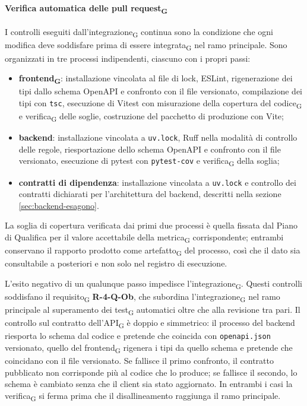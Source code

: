 \documentclass[a4paper, 10pt]{article}
\begin{document}
\paragraph{Verifica automatica delle pull request\textsubscript{G}}
I controlli eseguiti dall'integrazione\textsubscript{G} continua sono la condizione che ogni modifica deve soddisfare prima di essere integrata\textsubscript{G} nel ramo principale. Sono organizzati in tre processi indipendenti, ciascuno con i propri passi:

\begin{itemize}
    \setlength{\itemsep}{2pt}
    \item \textbf{frontend\textsubscript{G}}: installazione vincolata al file di lock, ESLint, rigenerazione dei tipi dallo schema OpenAPI e confronto con il file versionato, compilazione dei tipi con \texttt{tsc}, esecuzione di Vitest con misurazione della copertura del codice\textsubscript{G} e verifica\textsubscript{G} delle soglie, costruzione del pacchetto di produzione con Vite;
    \item \textbf{backend}: installazione vincolata a \texttt{uv.lock}, Ruff nella modalità di controllo delle regole, riesportazione dello schema OpenAPI e confronto con il file versionato, esecuzione di pytest con \texttt{pytest-cov} e verifica\textsubscript{G} della soglia;
    \item \textbf{contratti di dipendenza}: installazione vincolata a \texttt{uv.lock} e controllo dei contratti dichiarati per l'architettura del backend, descritti nella sezione \ref{sec:backend-esagono}.
\end{itemize}

\noindent La soglia di copertura verificata dai primi due processi è quella fissata dal Piano di Qualifica per il valore accettabile della metrica\textsubscript{G} corrispondente; entrambi conservano il rapporto prodotto come artefatto\textsubscript{G} del processo, così che il dato sia consultabile a posteriori e non solo nel registro di esecuzione.

L'esito negativo di un qualunque passo impedisce l'integrazione\textsubscript{G}. Questi controlli soddisfano il requisito\textsubscript{G} \textbf{R-4-Q-Ob}, che subordina l'integrazione\textsubscript{G} nel ramo principale al superamento dei test\textsubscript{G} automatici oltre che alla revisione tra pari. Il controllo sul contratto dell'API\textsubscript{G} è doppio e simmetrico: il processo del backend riesporta lo schema dal codice e pretende che coincida con \texttt{openapi.json} versionato, quello del frontend\textsubscript{G} rigenera i tipi da quello schema e pretende che coincidano con il file versionato. Se fallisce il primo confronto, il contratto pubblicato non corrisponde più al codice che lo produce; se fallisce il secondo, lo schema è cambiato senza che il client sia stato aggiornato. In entrambi i casi la verifica\textsubscript{G} si ferma prima che il disallineamento raggiunga il ramo principale.
\end{document}
